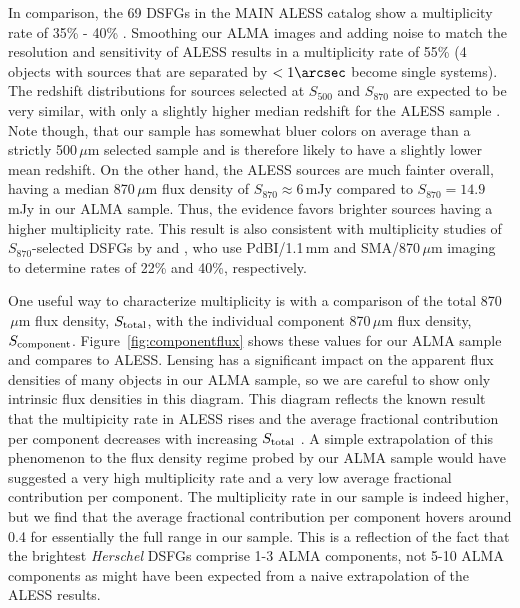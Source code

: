 \documentclass[iop]{emulateapj}
\begin{document}
In comparison, the 69 DSFGs in the MAIN ALESS catalog show a multiplicity rate
of 35\% - 40\% \citep{Hodge:2013qy}.  Smoothing our ALMA images and adding
noise to match the resolution and sensitivity of ALESS results in a
multiplicity rate of 55\% (4 objects with sources that are separated by
$<1\arcsec$ become single systems).  The redshift distributions for sources
selected at $S_{500}$ and $S_{870}$ are expected to be very similar, with only
a slightly higher median redshift for the ALESS sample \citep[e.g., $z_{\rm
med} = 2.0$ vs.  $z_{\rm med} = 2.2$; see][]{Zavala:2014lr}.  Note though, that
our sample has somewhat bluer colors on average than a strictly 500$\,\mu$m
selected sample and is therefore likely to have a slightly lower mean redshift.
On the other hand, the ALESS sources are much fainter overall, having a median
870$\,\mu$m flux density of $S_{870} \approx 6\,$mJy compared to $S_{870}
=14.9\,$mJy in our ALMA sample.  Thus, the evidence favors brighter sources
having a higher multiplicity rate.  This result is also consistent with
multiplicity studies of $S_{870}$-selected DSFGs by \citet{Smolcic:2012zl} and
\citet{Barger:2012yg}, who use PdBI/1.1$\,$mm and SMA/870$\,\mu$m imaging to
determine rates of 22\% and 40\%, respectively.

One useful way to characterize multiplicity is with a comparison of the total
870$\,\mu$m flux density, $S_{\rm total}$, with the individual component
870$\,\mu$m flux density, $S_{\rm component}$.  Figure~\ref{fig:componentflux}
shows these values for our ALMA sample and compares to ALESS.  Lensing has a
significant impact on the apparent flux densities of many objects in our ALMA
sample, so we are careful to show only intrinsic flux densities in this
diagram.  This diagram reflects the known result that the multipicity rate in
ALESS rises and the average fractional contribution per component decreases
with increasing $S_{\rm total}$ \citep{Hodge:2013qy}.  A simple extrapolation
of this phenomenon to the flux density regime probed by our ALMA sample would
have suggested a very high multiplicity rate and a very low average fractional
contribution per component.  The multiplicity rate in our sample is indeed
higher, but we find that the average fractional contribution per component
hovers around 0.4 for essentially the full range in our sample.  This is a
reflection of the fact that the brightest {\it Herschel} DSFGs comprise 1-3
ALMA components, not 5-10 ALMA components as might have been expected from a
naive extrapolation of the ALESS results.  
\end{document}
